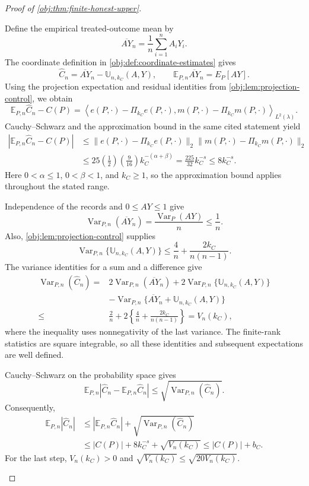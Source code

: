 \begin{proof}[Proof of \cref{obj:thm:finite-honest-upper}]
\begin{enumerate}
Define the empirical treated-outcome mean by
\[
\overline{AY}_n=\frac1n\sum_{i=1}^n A_iY_i.
\]
The coordinate definition in \cref{obj:def:coordinate-estimates} gives
\[
\widehat C_n
=\overline{AY}_n-\mathbb U_{n,k_C}(A,Y),
\qquad
\mathbb E_{P,n}\overline{AY}_n=E_P[AY].
\]
Using the projection expectation and residual identities from
\cref{obj:lem:projection-control}, we obtain
\[
\mathbb E_{P,n}\widehat C_n-C(P)
=
\left\langle
e(P,\cdot)-\Pi_{k_C}e(P,\cdot),
m(P,\cdot)-\Pi_{k_C}m(P,\cdot)
\right\rangle_{L^2(\lambda)}.
\]
Cauchy--Schwarz and the approximation bound in the same cited statement yield
\[
\begin{aligned}
|\mathbb E_{P,n}\widehat C_n-C(P)|
&\le
\|e(P,\cdot)-\Pi_{k_C}e(P,\cdot)\|_2
\|m(P,\cdot)-\Pi_{k_C}m(P,\cdot)\|_2\\
&\le
25\left(\frac12\right)\left(\frac9{16}\right)
k_C^{-(\alpha+\beta)}
=\frac{225}{32}k_C^{-s}
\le8k_C^{-s}.
\end{aligned}
\]
Here \(0<\alpha\le1\), \(0<\beta<1\), and \(k_C\ge1\), so the approximation bound applies throughout the stated range.

Independence of the records and \(0\le AY\le1\) give
\[
\operatorname{Var}_{P,n}(\overline{AY}_n)
=\frac{\operatorname{Var}_P(AY)}n
\le\frac1n.
\]
Also, \cref{obj:lem:projection-control} supplies
\[
\operatorname{Var}_{P,n}\{\mathbb U_{n,k_C}(A,Y)\}
\le\frac4n+\frac{2k_C}{n(n-1)}.
\]
The variance identities for a sum and a difference give
\[
\begin{aligned}
\operatorname{Var}_{P,n}(\widehat C_n)
={}&2\operatorname{Var}_{P,n}(\overline{AY}_n)
+2\operatorname{Var}_{P,n}\{\mathbb U_{n,k_C}(A,Y)\}\\
&-\operatorname{Var}_{P,n}
 \{\overline{AY}_n+\mathbb U_{n,k_C}(A,Y)\}\\
\le{}&\frac2n+2\left\{\frac4n+\frac{2k_C}{n(n-1)}\right\}
=V_n(k_C),
\end{aligned}
\]
where the inequality uses nonnegativity of the last variance.
The finite-rank statistics are square integrable, so all these identities and subsequent expectations are well defined.

Cauchy--Schwarz on the probability space gives
\[
\mathbb E_{P,n}
\left|\widehat C_n-\mathbb E_{P,n}\widehat C_n\right|
\le
\sqrt{\operatorname{Var}_{P,n}(\widehat C_n)}.
\]
Consequently,
\[
\begin{aligned}
\mathbb E_{P,n}|\widehat C_n|
&\le
|\mathbb E_{P,n}\widehat C_n|
+\sqrt{\operatorname{Var}_{P,n}(\widehat C_n)}\\
&\le
|C(P)|+8k_C^{-s}+\sqrt{V_n(k_C)}
\le |C(P)|+b_C.
\end{aligned}
\]
For the last step, \(V_n(k_C)>0\) and
\(\sqrt{V_n(k_C)}\le\sqrt{20V_n(k_C)}\).


\end{enumerate}
\end{proof}
